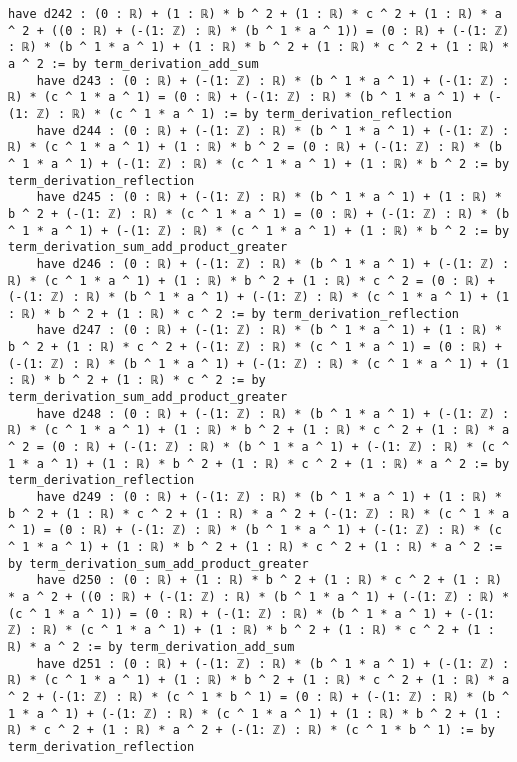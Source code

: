 \documentclass{article}
\begin{document}
\begin{tcolorbox}[colback=white!10, width=\linewidth]
\begin{lstlisting}[language=Lean4]
    have d242 : (0 : ℝ) + (1 : ℝ) * b ^ 2 + (1 : ℝ) * c ^ 2 + (1 : ℝ) * a ^ 2 + ((0 : ℝ) + (-(1: ℤ) : ℝ) * (b ^ 1 * a ^ 1)) = (0 : ℝ) + (-(1: ℤ) : ℝ) * (b ^ 1 * a ^ 1) + (1 : ℝ) * b ^ 2 + (1 : ℝ) * c ^ 2 + (1 : ℝ) * a ^ 2 := by term_derivation_add_sum
    have d243 : (0 : ℝ) + (-(1: ℤ) : ℝ) * (b ^ 1 * a ^ 1) + (-(1: ℤ) : ℝ) * (c ^ 1 * a ^ 1) = (0 : ℝ) + (-(1: ℤ) : ℝ) * (b ^ 1 * a ^ 1) + (-(1: ℤ) : ℝ) * (c ^ 1 * a ^ 1) := by term_derivation_reflection
    have d244 : (0 : ℝ) + (-(1: ℤ) : ℝ) * (b ^ 1 * a ^ 1) + (-(1: ℤ) : ℝ) * (c ^ 1 * a ^ 1) + (1 : ℝ) * b ^ 2 = (0 : ℝ) + (-(1: ℤ) : ℝ) * (b ^ 1 * a ^ 1) + (-(1: ℤ) : ℝ) * (c ^ 1 * a ^ 1) + (1 : ℝ) * b ^ 2 := by term_derivation_reflection
    have d245 : (0 : ℝ) + (-(1: ℤ) : ℝ) * (b ^ 1 * a ^ 1) + (1 : ℝ) * b ^ 2 + (-(1: ℤ) : ℝ) * (c ^ 1 * a ^ 1) = (0 : ℝ) + (-(1: ℤ) : ℝ) * (b ^ 1 * a ^ 1) + (-(1: ℤ) : ℝ) * (c ^ 1 * a ^ 1) + (1 : ℝ) * b ^ 2 := by term_derivation_sum_add_product_greater
    have d246 : (0 : ℝ) + (-(1: ℤ) : ℝ) * (b ^ 1 * a ^ 1) + (-(1: ℤ) : ℝ) * (c ^ 1 * a ^ 1) + (1 : ℝ) * b ^ 2 + (1 : ℝ) * c ^ 2 = (0 : ℝ) + (-(1: ℤ) : ℝ) * (b ^ 1 * a ^ 1) + (-(1: ℤ) : ℝ) * (c ^ 1 * a ^ 1) + (1 : ℝ) * b ^ 2 + (1 : ℝ) * c ^ 2 := by term_derivation_reflection
    have d247 : (0 : ℝ) + (-(1: ℤ) : ℝ) * (b ^ 1 * a ^ 1) + (1 : ℝ) * b ^ 2 + (1 : ℝ) * c ^ 2 + (-(1: ℤ) : ℝ) * (c ^ 1 * a ^ 1) = (0 : ℝ) + (-(1: ℤ) : ℝ) * (b ^ 1 * a ^ 1) + (-(1: ℤ) : ℝ) * (c ^ 1 * a ^ 1) + (1 : ℝ) * b ^ 2 + (1 : ℝ) * c ^ 2 := by term_derivation_sum_add_product_greater
    have d248 : (0 : ℝ) + (-(1: ℤ) : ℝ) * (b ^ 1 * a ^ 1) + (-(1: ℤ) : ℝ) * (c ^ 1 * a ^ 1) + (1 : ℝ) * b ^ 2 + (1 : ℝ) * c ^ 2 + (1 : ℝ) * a ^ 2 = (0 : ℝ) + (-(1: ℤ) : ℝ) * (b ^ 1 * a ^ 1) + (-(1: ℤ) : ℝ) * (c ^ 1 * a ^ 1) + (1 : ℝ) * b ^ 2 + (1 : ℝ) * c ^ 2 + (1 : ℝ) * a ^ 2 := by term_derivation_reflection
    have d249 : (0 : ℝ) + (-(1: ℤ) : ℝ) * (b ^ 1 * a ^ 1) + (1 : ℝ) * b ^ 2 + (1 : ℝ) * c ^ 2 + (1 : ℝ) * a ^ 2 + (-(1: ℤ) : ℝ) * (c ^ 1 * a ^ 1) = (0 : ℝ) + (-(1: ℤ) : ℝ) * (b ^ 1 * a ^ 1) + (-(1: ℤ) : ℝ) * (c ^ 1 * a ^ 1) + (1 : ℝ) * b ^ 2 + (1 : ℝ) * c ^ 2 + (1 : ℝ) * a ^ 2 := by term_derivation_sum_add_product_greater
    have d250 : (0 : ℝ) + (1 : ℝ) * b ^ 2 + (1 : ℝ) * c ^ 2 + (1 : ℝ) * a ^ 2 + ((0 : ℝ) + (-(1: ℤ) : ℝ) * (b ^ 1 * a ^ 1) + (-(1: ℤ) : ℝ) * (c ^ 1 * a ^ 1)) = (0 : ℝ) + (-(1: ℤ) : ℝ) * (b ^ 1 * a ^ 1) + (-(1: ℤ) : ℝ) * (c ^ 1 * a ^ 1) + (1 : ℝ) * b ^ 2 + (1 : ℝ) * c ^ 2 + (1 : ℝ) * a ^ 2 := by term_derivation_add_sum
    have d251 : (0 : ℝ) + (-(1: ℤ) : ℝ) * (b ^ 1 * a ^ 1) + (-(1: ℤ) : ℝ) * (c ^ 1 * a ^ 1) + (1 : ℝ) * b ^ 2 + (1 : ℝ) * c ^ 2 + (1 : ℝ) * a ^ 2 + (-(1: ℤ) : ℝ) * (c ^ 1 * b ^ 1) = (0 : ℝ) + (-(1: ℤ) : ℝ) * (b ^ 1 * a ^ 1) + (-(1: ℤ) : ℝ) * (c ^ 1 * a ^ 1) + (1 : ℝ) * b ^ 2 + (1 : ℝ) * c ^ 2 + (1 : ℝ) * a ^ 2 + (-(1: ℤ) : ℝ) * (c ^ 1 * b ^ 1) := by term_derivation_reflection

\end{lstlisting}
\end{tcolorbox}
\end{document}
